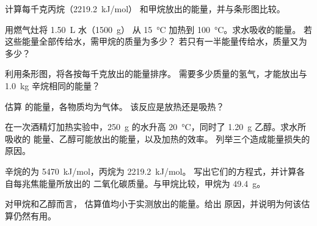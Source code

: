 \begin{exercise}[$\star\star$]\label{exo:g11:reaction-energy:8}
计算每千克丙烷（\qty{2219.2}{kJ/mol}）
和甲烷放出的能量，并与条形图比较。
\end{exercise}

\begin{exercise}[$\star\star$]\label{exo:g11:reaction-energy:9}
用燃气灶将 \qty{1.50}{L} 水（\qty{1500}{g}）
从 \qty{15}{\celsius} 加热到 \qty{100}{\celsius}。求水吸收的能量。
若这些能量全部传给水，需甲烷的质量为多少？
若只有一半能量传给水，质量又为多少？
\end{exercise}

\begin{exercise}[$\star\star$]\label{exo:g11:reaction-energy:10}
利用条形图，将各按每千克放出的能量排序。
需要多少质量的氢气，才能放出与 \qty{1.0}{kg} 辛烷相同的能量？
\end{exercise}

\begin{exercise}[$\star\star$]\label{exo:g11:reaction-energy:11}
估算  的能量，各物质均为气体。
该反应是放热还是吸热？
\end{exercise}

\begin{exercise}[$\star\star\star$]\label{exo:g11:reaction-energy:12}
在一次酒精灯加热实验中，\qty{250}{g} 的水升高 
\qty{20}{\celsius}，同时了 \qty{1.20}{g} 乙醇。求水所吸收的
能量、乙醇可能放出的能量，以及加热的效率。
列举三个造成能量损失的原因。
\end{exercise}

\begin{exercise}[$\star\star\star$]\label{exo:g11:reaction-energy:13}
辛烷的为 \qty{5470}{kJ/mol}，丙烷为 \qty{2219.2}{kJ/mol}。
写出它们的方程式，并计算各自每兆焦能量所放出的
二氧化碳质量。与甲烷比较，甲烷为 \qty{49.4}{g}。
\end{exercise}

\begin{exercise}[$\star\star\star$]\label{exo:g11:reaction-energy:14}
对甲烷和乙醇而言，
估算值均小于实测放出的能量。给出
原因，并说明为何该估算仍然有用。
\end{exercise}

